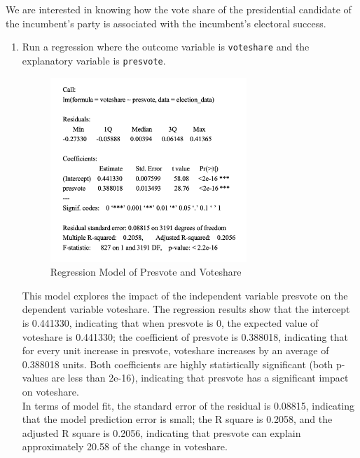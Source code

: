 \documentclass[12pt,letterpaper]{article}
\begin{document}
\noindent We are interested in knowing how the vote share of the presidential candidate of the incumbent's party is associated with the incumbent's electoral success.
	\vspace{.25cm}
	\begin{enumerate}
		\item Run a regression where the outcome variable is \texttt{voteshare} and the explanatory variable is \texttt{presvote}.
			\vspace{1cm}
		
		
		\begin{figure}[h!]
			\caption{\footnotesize{Regression Model of Presvote and Voteshare}}
			\vspace{.5cm}
			\centering
			\label{fig:3.1}
			\includegraphics[width=0.7\textwidth]{summary3.png}
		\end{figure}
		
This model explores the impact of the independent variable presvote on the dependent variable voteshare. The regression results show that the intercept is 0.441330, indicating that when presvote is 0, the expected value of voteshare is 0.441330; the coefficient of presvote is 0.388018, indicating that for every unit increase in presvote, voteshare increases by an average of 0.388018 units. Both coefficients are highly statistically significant (both p-values are less than 2e-16), indicating that presvote has a significant impact on voteshare.\\
		In terms of model fit, the standard error of the residual is 0.08815, indicating that the model prediction error is small; the R square is 0.2058, and the adjusted R square is 0.2056, indicating that presvote can explain approximately 20.58 of the change in voteshare.\\
		

\end{enumerate}
\end{document}
